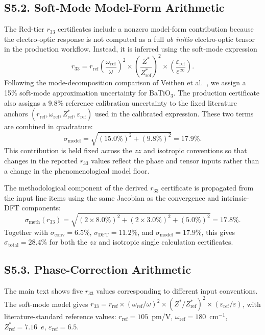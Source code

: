\documentclass[onecolumn,superscriptaddress,amsmath,amssymb,longbibliography]{revtex4-2}
\newcommand{\conv}{\mathrm{conv}}
\newcommand{\meth}{\mathrm{meth}}
\begin{document}
\subsection{S5.2. Soft-Mode Model-Form Arithmetic}

The Red-tier $r_{33}$ certificates include a nonzero model-form contribution
because the electro-optic response is not computed as a full \emph{ab initio}
electro-optic tensor in the production workflow. Instead, it is inferred using
the soft-mode expression
\[
r_{33}=r_{\mathrm{ref}}
\left(\frac{\omega_{\mathrm{ref}}}{\omega}\right)^2
\times
\left(\frac{Z^*}{Z^*_{\mathrm{ref}}}\right)^2
\times
\left(\frac{\varepsilon_{\mathrm{ref}}}{\varepsilon^\infty}\right).
\]
Following the mode-decomposition comparison of Veithen et al.\
\cite{Veithen2005}, we assign a 15\% soft-mode approximation uncertainty for
BaTiO$_3$. The production certificate also assigns a 9.8\% reference
calibration uncertainty to the fixed literature anchors
$(r_{\mathrm{ref}},\omega_{\mathrm{ref}},Z^*_{\mathrm{ref}},
\varepsilon_{\mathrm{ref}})$ used in the calibrated expression. These two
terms are combined in quadrature:
\begin{equation}
    \sigma_{\mathrm{model}}
    =
    \sqrt{(15.0\%)^2 + (9.8\%)^2}
    =
    17.9\%.
\end{equation}
This contribution is held fixed across the $zz$ and isotropic conventions so
that changes in the reported $r_{33}$ values reflect the phase and tensor
inputs rather than a change in the phenomenological model floor.

The methodological component of the derived $r_{33}$ certificate is propagated
from the input line items using the same Jacobian as the convergence and
intrinsic-DFT components:
\[
\sigma_{\meth}(r_{33}) =
\sqrt{(2\times 8.0\%)^2 + (2\times 3.0\%)^2 + (5.0\%)^2}
=17.8\%.
\]
Together with $\sigma_\conv=6.5\%$, $\sigma_{\mathrm{DFT}}=11.2\%$, and
$\sigma_{\mathrm{model}}=17.9\%$, this gives
$\sigma_{\mathrm{total}}=28.4\%$ for both the $zz$ and isotropic single
calculation certificates.


\subsection{S5.3. Phase-Correction Arithmetic}

The main text shows five $r_{33}$ values corresponding to different
input conventions. The soft-mode model gives $r_{33} = r_{\mathrm{ref}} \times
(\omega_{\mathrm{ref}}/\omega)^2 \times (Z^*/Z^*_{\mathrm{ref}})^2 \times
(\varepsilon_{\mathrm{ref}}/\varepsilon)$, with literature-standard reference
values: $r_{\mathrm{ref}} = 105$~pm/V, $\omega_{\mathrm{ref}} =
180$~cm$^{-1}$, $Z^*_{\mathrm{ref}} = 7.16$~$e$,
$\varepsilon_{\mathrm{ref}} = 6.5$.
\end{document}
